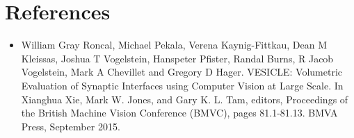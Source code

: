 \documentclass[11pt]{article} %
\begin{document}
\section{References}
\begin{itemize}
\item William Gray Roncal, Michael Pekala, Verena Kaynig-Fittkau, Dean M Kleissas, Joshua T Vogelstein, Hanspeter Pfister, Randal Burns, R Jacob Vogelstein, Mark A Chevillet and Gregory D Hager. VESICLE: Volumetric Evaluation of Synaptic Interfaces using Computer Vision at Large Scale. In Xianghua Xie, Mark W. Jones, and Gary K. L. Tam, editors, Proceedings of the British Machine Vision Conference (BMVC), pages 81.1-81.13. BMVA Press, September 2015.
\end{itemize}
\end{document}
